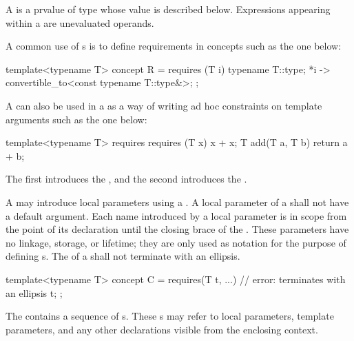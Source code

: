 \pnum
A  is a prvalue of type 
whose value is described below.
Expressions appearing within a 
are unevaluated operands.

\pnum
\begin{example}
A common use of s is to define
requirements in concepts such as the one below:
\begin{codeblock}
template<typename T>
  concept R = requires (T i) {
    typename T::type;
    {*i} -> convertible_to<const typename T::type&>;
  };
\end{codeblock}
A  can also be used in a
 as a way of writing ad hoc
constraints on template arguments such as the one below:
\begin{codeblock}
template<typename T>
  requires requires (T x) { x + x; }
    T add(T a, T b) { return a + b; }
\end{codeblock}
The first  introduces the
, and the second
introduces the .
\end{example}

\pnum
A  may introduce local parameters using a
.
A local parameter of a  shall not have a
default argument.
Each name introduced by a local parameter is in scope from the point
of its declaration until the closing brace of the
.
These parameters have no linkage, storage, or lifetime; they are only used
as notation for the purpose of defining s.
The  of a
shall not terminate with an ellipsis.
\begin{example}
\begin{codeblock}
template<typename T>
concept C = requires(T t, ...) {    // error: terminates with an ellipsis
  t;
};
\end{codeblock}
\end{example}

\pnum
{}%
The  contains
a sequence of s.
These s may refer to local
parameters, template parameters, and any other declarations visible from the
enclosing context.

